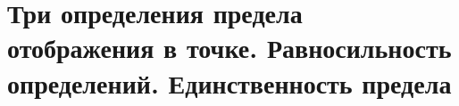 \section{Три определения предела отображения в точке. Равносильность определений. Единственность предела}